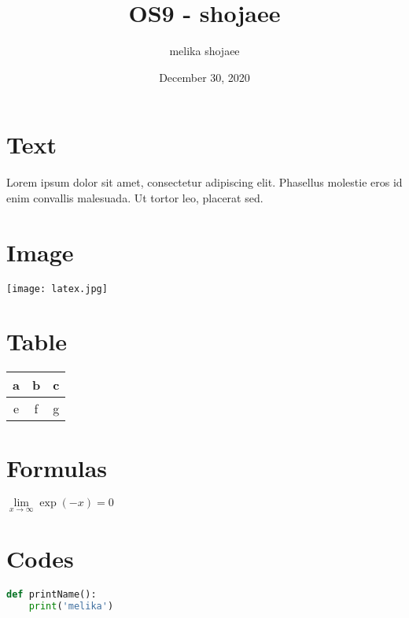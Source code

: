 \documentclass{article}
\title{OS9 - shojaee}
\author{melika shojaee}
\date{December 30, 2020}
\begin{document}
\maketitle
\section{Text}
Lorem ipsum dolor sit amet, consectetur adipiscing elit. Phasellus molestie eros id enim convallis malesuada. Ut tortor leo, placerat sed.
\section{Image}
\texttt{[image: latex.jpg]}      
\section{Table} 

\begin{tabular}{|c|c|c|}
\hline
 a & b & c\\ 
\hline
 e & f & g\\ 

\hline
\end{tabular}

\section{Formulas}
$\lim\limits_{x \to \infty} \exp(-x) = 0$
\section{Codes}
\begin{lstlisting}[language=Python]
def printName(): 
    print('melika')
\end{lstlisting}
\end{document}
